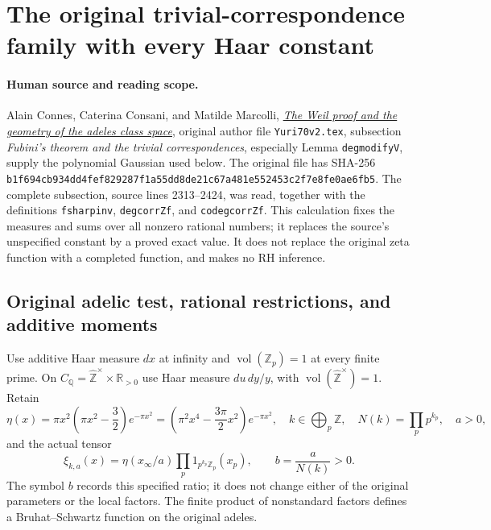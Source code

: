 \section{The original trivial-correspondence family with every Haar constant}
\label{sec:cc-exact-trivial-correspondence}

\paragraph{Human source and reading scope.}
Alain Connes, Caterina Consani, and Matilde Marcolli,
\href{https://arxiv.org/abs/math/0703392}{\emph{The Weil proof and the
geometry of the adeles class space}}, original author file
\texttt{Yuri70v2.tex}, subsection \emph{Fubini's theorem and the trivial
correspondences}, especially Lemma \texttt{degmodifyV}, supply the
polynomial Gaussian used below. The original file has SHA-256
\texttt{b1f694cb934dd4fef829287f1a55dd8de21c67a481e552453c2f7e8fe0ae6fb5}.
The complete subsection, source lines 2313--2424, was read, together
with the definitions \texttt{fsharpinv}, \texttt{degcorrZf}, and
\texttt{codegcorrZf}. This calculation fixes the measures and sums over
all nonzero rational numbers; it replaces the source's unspecified
constant by a proved exact value. It does not replace the original
zeta function with a completed function, and makes no RH inference.

\subsection{Original adelic test, rational restrictions, and additive moments}

Use additive Haar measure $dx$ at infinity and
$\operatorname{vol}(\mathbb Z_p)=1$ at every finite prime. On
$C_{\mathbb Q}=\widehat{\mathbb Z}^{\times}\times\mathbb R_{>0}$
use Haar measure $du\,dy/y$, with
$\operatorname{vol}(\widehat{\mathbb Z}^{\times})=1$. Retain
\begin{equation}\tag{ETC1}
 \eta(x)=\pi x^2\left(\pi x^2-\frac32\right)e^{-\pi x^2}
        =\left(\pi^2x^4-\frac{3\pi}{2}x^2\right)e^{-\pi x^2},
 \quad k\in\bigoplus_p\mathbb Z,
 \quad N(k)=\prod_pp^{k_p},\quad a>0,
\end{equation}
and the actual tensor
\begin{equation}\tag{ETC2}
 \xi_{k,a}(x)=\eta(x_\infty/a)
                  \prod_p1_{p^{k_p}\mathbb Z_p}(x_p),
 \qquad b=\frac a{N(k)}>0.
\end{equation}
The symbol $b$ records this specified ratio; it does not change either
of the original parameters or the local factors. The finite product
of nonstandard factors defines a Bruhat--Schwartz function on the
original adeles.

